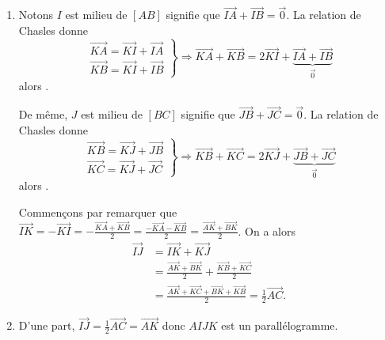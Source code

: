 \begin{enumerate}
\begin{enumerate}
					\item 
							Notons $I$ est milieu de $[AB]$ signifie que 
							$\overrightarrow{IA} + \overrightarrow{IB} = \vec{0}$.
							La relation de Chasles donne 
							\[
								\left.
									\begin{array}{r}
										\overrightarrow{KA} = \overrightarrow{KI} + \overrightarrow{IA}	\\
										\overrightarrow{KB} = \overrightarrow{KI} + \overrightarrow{IB}
									\end{array}
								\right\rbrace
								\Rightarrow
								\overrightarrow{KA} + \overrightarrow{KB} 
									= 2 \overrightarrow{KI} + \underbrace{\overrightarrow{IA} + \overrightarrow{IB}}_{\vec{0}}
							\]
							alors .
							
							De m\^eme, $J$ est milieu de $[BC]$ signifie que 
							$\overrightarrow{JB} + \overrightarrow{JC} = \vec{0}$.
							La relation de Chasles donne 
							\[
								\left.
									\begin{array}{r}
										\overrightarrow{KB} = \overrightarrow{KJ} + \overrightarrow{JB}	\\
										\overrightarrow{KC} = \overrightarrow{KJ} + \overrightarrow{JC}
									\end{array}
								\right\rbrace
								\Rightarrow
								\overrightarrow{KB} + \overrightarrow{KC} 
									= 2 \overrightarrow{KJ} + \underbrace{\overrightarrow{JB} + \overrightarrow{JC}}_{\vec{0}}
							\]
							alors .

							Commen\c{c}ons par remarquer que 
							$\overrightarrow{IK} = - \overrightarrow{KI} = - \frac{\overrightarrow{KA}+\overrightarrow{KB}}{2}
							= \frac{-\overrightarrow{KA}-\overrightarrow{KB}}{2} = \frac{\overrightarrow{AK}+\overrightarrow{BK}}{2}$.
							On a alors 
							\begin{align*}
								\overrightarrow{IJ}
									&= \overrightarrow{IK} + \overrightarrow{KJ}\\
									&= \frac{\overrightarrow{AK}+\overrightarrow{BK}}{2}
									 + \frac{\overrightarrow{KB}+\overrightarrow{KC}}{2}\\
									&= \frac{
										\overrightarrow{AK}+\overrightarrow{KC}
										+\overrightarrow{BK}+\overrightarrow{KB}}{2}
									 = \frac{1}{2}\overrightarrow{AC}.
							\end{align*}
					\item {}
						D'une part,
						$\overrightarrow{IJ} = \frac{1}{2} \overrightarrow{AC} = \overrightarrow{AK}$
						donc $AIJK$ est un parall\'elogramme.
						

\end{enumerate}
\end{enumerate}
